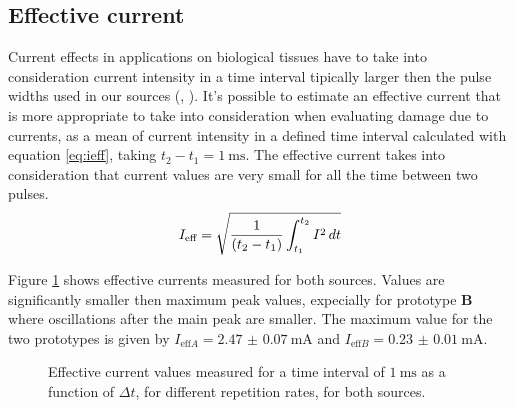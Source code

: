 \subsection{Effective current}
Current effects in applications on biological tissues have to take into consideration current intensity in a time interval tipically larger then the pulse widths used in our sources (\cite{doi:10.1002/ppap.200731208}, \cite{unipd:ceciliaDBD}). It's possible to estimate an effective current that is more appropriate to take into consideration when evaluating damage due to currents, as a mean of current intensity in a defined time interval calculated with equation \ref{eq:ieff}, taking $t_2-t_1 = \SI{1}{\milli\second}$. The effective current takes into consideration that current values are very small for all the time between two pulses.
\begin{equation}
 \centering
 I_{\text{eff}} = \sqrt{\frac{1}{(t_2-t_1)}\int_{t_1}^{t_2} I^2 \,dt}
 \label{eq:ieff}
\end{equation}

Figure \ref{fig:ieff} shows effective currents measured for both sources. Values are significantly smaller then maximum peak values, expecially for prototype \textbf{B} where oscillations after the main peak are smaller. The maximum value for the two prototypes is given by $I_{\text{eff} A} = \SI{2.47(7)}{\milli\ampere}$ and $I_{\text{eff} B} = \SI{0.23(1)}{\milli\ampere}$.

\begin{figure}
 \centering
 \hfill
 \caption{Effective current values measured for a time interval of $\SI{1}{\milli\second}$ as a function of $\Delta t$, for different repetition rates, for both sources.}
 \label{fig:ieff}
\end{figure}


